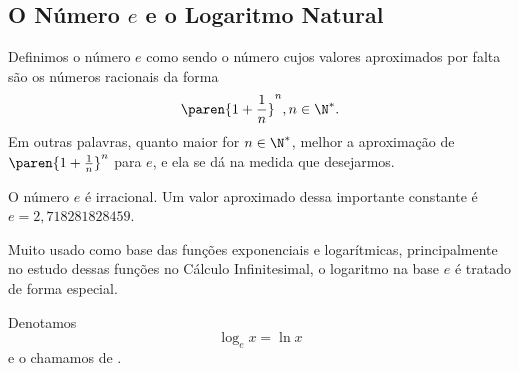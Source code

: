 \subsection{O Número $e$ e o Logaritmo Natural}

\begin{definition}
Definimos o número $e$ como sendo o número cujos valores aproximados
por falta são os números racionais da forma $$
\paren{1+ \frac 1 n}^n , n\in \N^*.$$ Em outras palavras, quanto
maior for $n \in \N^*$, melhor a aproximação de $\paren{1+ \frac
1 n}^n$ para $e$, e ela se dá na medida que desejarmos.
\end{definition}

\begin{remark}
O número $e$ é irracional. Um valor aproximado dessa importante
constante é $e = 2{,}718281828459$.
\end{remark}

Muito usado como base das funções exponenciais e logarítmicas,
principalmente no estudo dessas funções no Cálculo Infinitesimal, o
logaritmo na base $e$ é tratado de forma especial.

\begin{definition}
Denotamos $$\log_e x = \ln x$$ e o chamamos de .
\end{definition}